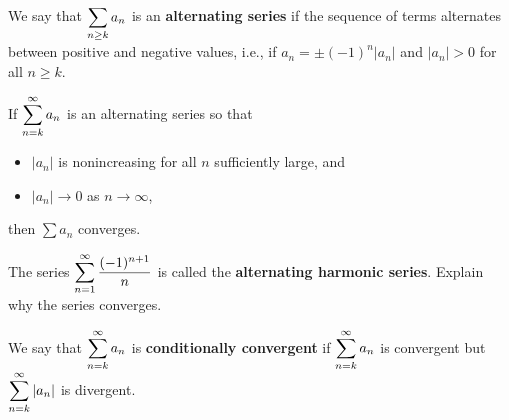 \setcounter{chapter}{10}
\setcounter{section}{6}
\setcounter{theorem}{0}
\setcounter{equation}{0}


\begin{definition}
We say that $\displaystyle\sum_{n\ge k} a_n$ is an \textbf{alternating series} if the sequence of terms alternates between positive and negative values, 
i.e., if $a_n = \pm(-1)^n|a_n|$ and $|a_n|>0$ for all $n\ge k$. 
\end{definition}

\begin{theorem}
If $\displaystyle\sum_{n=k}^\infty a_n$ is an alternating series so that
\begin{itemize}
\item $|a_n|$ is nonincreasing for all $n$ sufficiently large, and
\item $|a_n|\to 0$ as $n\to\infty$,
\end{itemize}
then $\sum a_n$ converges.
\end{theorem}

\begin{example}
The series $\displaystyle\sum_{n=1}^\infty\frac{(-1)^{n+1}}{n}$ is called the \textbf{alternating harmonic series}.
Explain why the series converges.
\end{example}
\ifdefined\SOLUTION
{}
\fi

\vfill

\begin{definition}
We say that $\displaystyle\sum_{n=k}^\infty a_n$ is \textbf{conditionally convergent} 
if $\displaystyle\sum_{n=k}^\infty a_n$ is convergent but $\displaystyle\sum_{n=k}^\infty |a_n|$ is divergent. 
\end{definition}

\newpage

